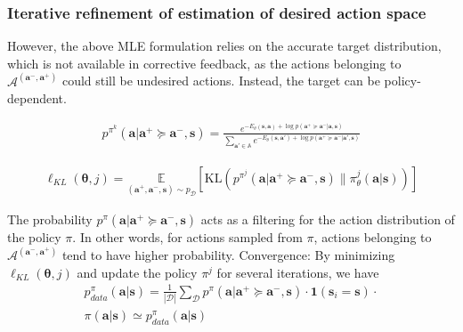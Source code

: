\subsubsection{Iterative refinement of estimation of desired action space}

However, the above MLE formulation relies on the accurate target distribution, which is not available in corrective feedback, as the actions belonging to $\mathcal{A}^{(\bm a^{-},  \bm a^{+})}$ could still be undesired actions.
Instead, the target can be policy-dependent. 


\begin{align}
   p^{\pi^k}\!(\bm{a}|\bm{a}^+ \!\succeq\! \bm{a}^-, \bm{s}) = 
   \frac{e^{-E_{\theta}(\bm{s},\bm{a}) + \log p(\bm{a}^+ \succeq \bm{a}^- | \bm{a}, \bm s)}}{\sum_{\bm{a}' \in \mathbb{A}} e^{-E_{\theta}(\bm{s},\bm{a}') + \log p(\bm{a}^+ \succeq \bm{a}^- | \bm{a}', \bm s)}}
\end{align}


\begin{align*}
    \ell_{KL}(\bm \theta, j) = \!\!\!\underset{(\bm{a}^{+}, \bm{a}^{-}, \bm{s}) \sim p_{\mathcal D}\!\!}{\mathbb{E}} \left[ \mathrm{KL}\!\left(p^{\pi^j}\!(\bm a|\bm a^+ \succeq \bm a^-, \bm s) \big\| \pi_{\theta}^j(\bm a | \bm s) \right) \! \right] 
\end{align*}

The probability $p^{\pi} (  \bm a |\bm a^+ \succeq \bm a^-,  \bm s)$ acts as a filtering for the action distribution of the policy $\pi$. In other words, for actions sampled from $\pi$, actions belonging to $\mathcal{A}^{(\bm a^-, \bm a^+)}$ tend to have higher probability.  
Convergence: 
By minimizing $\ell_{KL}(\bm \theta, j)$ and update the policy $\pi^j$ for several iterations, we have
\begin{align}
    p^{\pi}_{data} (\bm a | \bm s) = \frac{1}{|\mathcal{D}|}\sum_{\mathcal{D}} p^{\pi}(\bm a | \bm a^+ \succeq \bm a^-, \bm s) \cdot \mathbf{1}(\bm s_i =\bm s) \cdot \\
    \pi(\bm a | \bm s) \simeq p^{\pi}_{data} (\bm a | \bm s)
\end{align}


